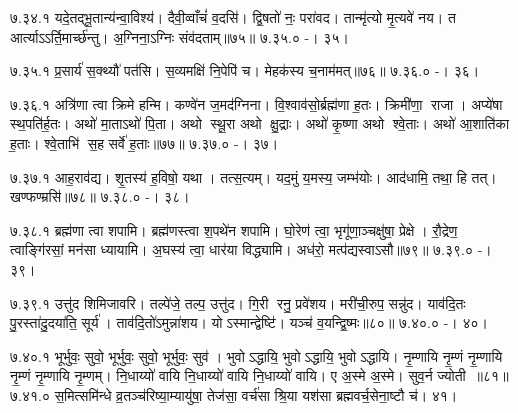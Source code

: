 ७.३४.१
यदे॒तद्भू॒तान्य॑न्वा॒विश्य॑। दैवी॒व्वाँचं॑ व॒दसि॑। द्वि॒षतो॑ नः॒ परा॑वद। तान्मृ॑त्यो मृ॒त्यवे॑ नय। त आर्त्याऽऽर्ति॒मार्च्छ॑न्तु। अ॒ग्निना॒ऽग्निः संव॑दताम्॥७५॥
७.३५.०
-। ३५।
\anuvakamend

७.३५.१
प्र॒सार्य॑ स॒क्थ्यौ॑ पत॑सि। स॒व्यमक्षि॑ नि॒पेपि॑ च। मेहक॑स्य च॒नाम॑मत्॥७६॥
७.३६.०
-। ३६।
\anuvakamend

७.३६.१
अत्रि॑णा त्वा क्रिमे हन्मि। कण्वे॑न ज॒मद॑ग्निना। वि॒श्वाव॑सो॒र्ब्रह्म॑णा ह॒तः। क्रिमी॑णा॒ राजा। अप्ये॑षा स्थ॒पति॑र्ह॒तः। अथो॑ मा॒ताऽथो॑ पि॒ता। अथो स्थू॒रा अथो क्षु॒द्राः। अथो॑ कृ॒ष्णा अथो श्वे॒ताः। अथो॑ आ॒शाति॑का ह॒ताः। श्वे॒ताभि॑ स॒ह सर्वे॑ ह॒ताः॥७७॥
७.३७.०
-। ३७।
\anuvakamend

७.३७.१
आह॒राव॑द्य। शृ॒तस्य॑ ह॒विषो॒ यथा। तत्स॒त्यम्। यद॒मुं य॒मस्य॒ जम्भ॑योः। आद॑धामि॒ तथा॒ हि तत्। खण्फण्म्रसि॑॥७८॥
७.३८.०
-। ३८।
\anuvakamend

७.३८.१
ब्रह्म॑णा त्वा शपामि। ब्रह्म॑णस्त्वा श॒पथे॑न शपामि। घो॒रेण॑ त्वा॒ भृगू॑णा॒ञ्चक्षु॑षा॒ प्रेक्षे। रौ॒द्रेण॒ त्वाङ्गि॑रसां॒ मन॑सा ध्यायामि। अ॒घस्य॑ त्वा॒ धार॑या विद्ध्यामि। अध॑रो॒ मत्प॑द्यस्वाऽसौ॥७९॥
७.३९.०
-। ३९।
\anuvakamend

७.३९.१
उत्तु॑द शिमिजावरि। तल्पे॑जे॒ तल्प॒ उत्तु॑द। गि॒री रनु॒ प्रवे॑शय। मरी॑ची॒रुप॒ सन्नु॑द। याव॑दि॒तः पु॒रस्ता॑दु॒दया॑ति॒ सूर्य॑। ताव॑दि॒तो॑ऽमुन्ना॑शय। योऽस्मान्द्वेष्टि॑। यञ्च॑ व॒यन्द्वि॒ष्मः॥८०॥
७.४०.०
-। ४०।
\anuvakamend

७.४०.१
भूर्भुवः॒ सुवो॒ भूर्भुवः॒ सुवो॒ भूर्भुवः॒ सुव॑। भुवोऽद्धायि॒ भुवोऽद्धायि॒ भुवोऽद्धायि। नृ॒म्णायि नृ॒म्णं नृ॒म्णायि नृ॒म्णं नृ॒म्णायि नृ॒म्णम्। नि॒धाय्यो॑ वायि नि॒धाय्यो॑ वायि नि॒धाय्यो॑ वायि। ए अ॒स्मे अ॒स्मे। सुव॒र्न ज्योती॥८१॥
७.४१.०
स॒मित्समि॑न्धे व्र॒तञ्च॑रिष्या॒म्यायु॑षा॒ तेज॑सा॒ वर्च॑सा श्रि॒या यश॑सा ब्रह्मवर्च॒सेना॒ष्टौ च॑। ४१।
\anuvakamend

